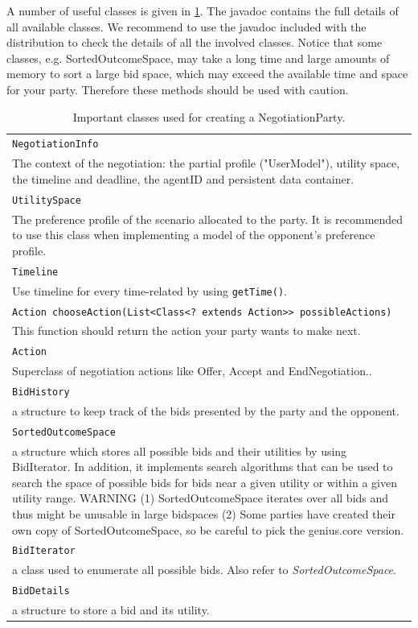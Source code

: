 \documentclass[]{article}
\begin{document}
A number of useful classes is given in \ref{tab:agentclass}. The javadoc contains the full details of all available classes. We recommend to use the javadoc included with the distribution to check the details of all the involved classes.  Notice that some classes, e.g. SortedOutcomeSpace, may take a long time and large amounts of memory to sort a large bid space, which may exceed the available time and space for your party. Therefore these methods should be used with caution.

\begin{table}
\begin{tabular}{m{}}
\hline
\texttt{NegotiationInfo}\\
The context of the negotiation: the partial profile ("UserModel"), utility space, the timeline and deadline, the agentID and persistent data container.\\
\hline
\texttt{UtilitySpace}\\
The preference profile of the scenario allocated to the party. It is recommended to use this class when implementing a model of the opponent's preference profile.\\
\hline
\texttt{Timeline }\\
Use timeline for every time-related by using \texttt{getTime()}.\\
\texttt{Action chooseAction(List<Class<? extends Action>> possibleActions)}\\
This function should return the action your party wants to make next.\\
\hline
\texttt{Action}\\
Superclass of negotiation actions like Offer, Accept and EndNegotiation..\\
\hline
\texttt{BidHistory}\\
a structure to keep track of the bids presented by the party and the opponent.\\
\hline
\texttt{SortedOutcomeSpace}\\
a structure which stores all possible bids and their utilities by using BidIterator. In addition, it implements search algorithms that can be used to search the space of possible bids for bids near a given utility or within a given utility range. WARNING (1) SortedOutcomeSpace iterates over all bids and thus might be unusable in large bidspaces (2) Some parties have created their own copy of SortedOutcomeSpace, so be careful to pick the genius.core version. \\
\hline
\texttt{BidIterator}\\
a class used to enumerate all possible bids. Also refer to \textit{SortedOutcomeSpace}.\\
\hline
\texttt{BidDetails}\\
a structure to store a bid and its utility.\\
\hline
\end{tabular}

\caption{Important classes used for creating a NegotiationParty.}
\label{tab:agentclass}
\end{table}
\end{document}
